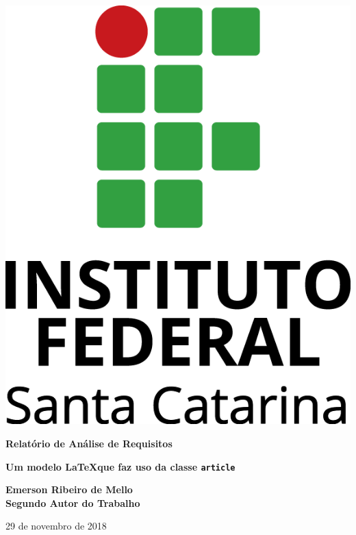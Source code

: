 \documentclass[11pt]{article}
\begin{document}
\pagestyle{empty}
\begin{center}

\includegraphics[scale=.7]{figuras/ifsc-logo-v}
\vspace{7.5cm}

{\huge \bfseries Relatório de Análise de Requisitos}

\vspace{.5cm}

{\large \bfseries Um modelo \LaTeX que faz uso da classe \texttt{article}}

\vfill
\end{center}

{\noindent \large \bfseries 
Emerson Ribeiro de Mello 
\\ Segundo Autor do Trabalho
}

\begin{flushright}
29 de novembro de 2018
\end{flushright}
\end{document}
